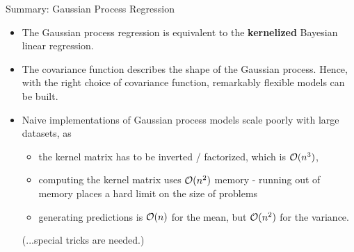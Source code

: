 \begin{frame}[c]{Summary: Gaussian Process Regression}

\begin{itemize}
\item The Gaussian process regression is equivalent to the \textbf{kernelized} Bayesian linear regression.
\vspace{3mm}

\item The covariance function describes the shape of the Gaussian process. Hence, with the right choice of covariance function, remarkably flexible models can be built.
\vspace{3mm}

\item Naive implementations of Gaussian process models scale poorly with large datasets, as
\vspace{3mm}

\begin{itemize}
\item the kernel matrix has to be inverted / factorized, which is $\mathcal{O}(n^3)$,
\vspace{3mm}

\item computing the kernel matrix uses $\mathcal{O}(n^2)$ memory - running out of memory places a hard limit on the size of problems
\vspace{3mm}

\item generating predictions is $\mathcal{O}(n)$ for the mean, but $\mathcal{O}(n^2)$ for the variance.
\end{itemize}
(...special tricks are needed.)
\end{itemize}


\end{frame}



